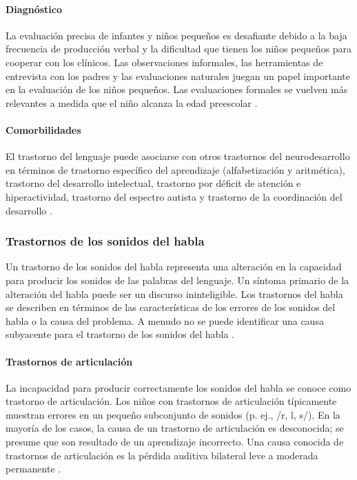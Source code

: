 \paragraph{Diagnóstico}
La evaluación precisa de infantes y niños pequeños es desafiante debido a la
baja frecuencia de producción verbal y la dificultad que tienen los niños
pequeños para cooperar con los clínicos. Las observaciones informales, las
herramientas de entrevista con los padres y las evaluaciones naturales juegan un
papel importante en la evaluación de los niños pequeños. Las evaluaciones
formales se vuelven más relevantes a medida que el niño alcanza la edad
preescolar \cite{Nelson53}.

\paragraph{Comorbilidades}
El trastorno del lenguaje puede asociarse con otros trastornos del
neurodesarrollo en términos de trastorno específico del aprendizaje
(alfabetización y aritmética), trastorno del desarrollo intelectual, trastorno
por déficit de atención e hiperactividad, trastorno del espectro autista y
trastorno de la coordinación del desarrollo \cite{Feldman44}.

\subsubsection{Trastornos de los sonidos del habla}
Un trastorno de los sonidos del habla representa una alteración en la
capacidad para producir los sonidos de las palabras del lenguaje. Un síntoma
primario de la alteración del habla puede ser un discurso ininteligible. Los
trastornos del habla se describen en términos de las características de los
errores de los sonidos del habla o la causa del problema. A menudo no se puede
identificar una causa subyacente para el trastorno de los sonidos del habla
\cite{Feldman44}.

\paragraph{Trastornos de articulación}
La incapacidad para producir correctamente los sonidos del habla se conoce
como trastorno de articulación. Los niños con trastornos de articulación
típicamente muestran errores en un pequeño subconjunto de sonidos
(p. ej., /r, l, s/). En la mayoría de los casos, la causa de un trastorno de
articulación es desconocida; se presume que son resultado de un aprendizaje
incorrecto. Una causa conocida de trastornos de articulación es la pérdida
auditiva bilateral leve a moderada permanente \cite{Feldman44}.

